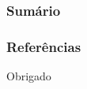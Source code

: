 \documentclass{beamer}
\title[\shortpapertitle]{\papertitle}
\author[Eduardo Tenório]{\authorname}
\institute[CIn-UFPE]
{
    \centername
    \\
    \universityname
    \\
    \papertype\space em \programname
    \\
    \medskip
    \textit{embat@cin.ufpe.br}
}
\date{\defensedate}
\begin{document}

\begin{frame}
\titlepage
\end{frame}

\begin{frame}
\frametitle{Sumário}
\tableofcontents
\end{frame}







\begin{frame}
\frametitle{Referências}
\footnotesize{\printbibliography}
\end{frame}

\begin{frame}
\Huge{\centerline{Obrigado}}
\end{frame}
\end{document}
